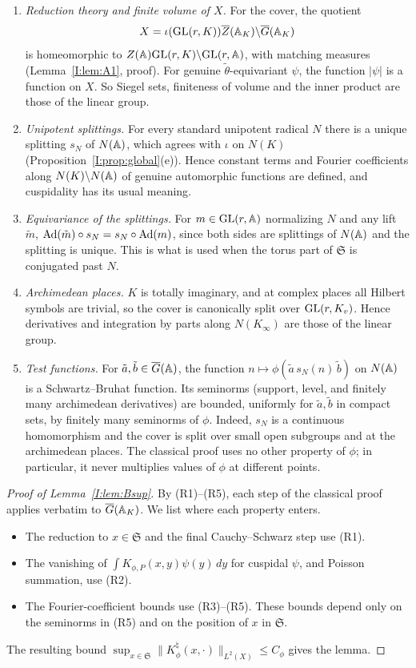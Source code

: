 \begin{enumerate}[label=(R\arabic*),leftmargin=3em]
\item \emph{Reduction theory and finite volume of $X$.} For the cover, the quotient \[ X=\iota(\mathrm{GL}(r,K))\overline{Z}(\mathbb{A}_K)\backslash\overline{G}(\mathbb{A}_K) \] is homeomorphic to $Z(\mathbb{A})\mathrm{GL}(r,K)\backslash\mathrm{GL}(r,\mathbb{A})$, with matching measures (Lemma~\ref{I:lem:A1}, proof). For genuine $\tilde\theta$-equivariant $\psi$, the function $|\psi|$ is a function on $X$. So Siegel sets, finiteness of volume and the inner product are those of the linear group.
\item \emph{Unipotent splittings.} For every standard unipotent radical $N$ there is a unique splitting $s_N$ of $N(\mathbb{A})$, which agrees with $\iota$ on $N(K)$ (Proposition~\ref{I:prop:global}(e)). Hence constant terms and Fourier coefficients along $N(K)\backslash N(\mathbb{A})$ of genuine automorphic functions are defined, and cuspidality has its usual meaning.
\item \emph{Equivariance of the splittings.} For $m\in\mathrm{GL}(r,\mathbb{A})$ normalizing $N$ and any lift $\tilde m$, $\operatorname{Ad}(\tilde m)\circ s_N=s_N\circ\operatorname{Ad}(m)$, since both sides are splittings of $N(\mathbb{A})$ and the splitting is unique. This is what is used when the torus part of $\mathfrak S$ is conjugated past $N$.
\item \emph{Archimedean places.} $K$ is totally imaginary, and at complex places all Hilbert symbols are trivial, so the cover is canonically split over $\mathrm{GL}(r,K_v)$. Hence derivatives and integration by parts along $N(K_\infty)$ are those of the linear group.
\item \emph{Test functions.} For $\tilde a,\tilde b\in\overline{G}(\mathbb{A})$, the function $n\mapsto\phi(\tilde a\,s_N(n)\,\tilde b)$ on $N(\mathbb{A})$ is a Schwartz--Bruhat function. Its seminorms (support, level, and finitely many archimedean derivatives) are bounded, uniformly for $\tilde a,\tilde b$ in compact sets, by finitely many seminorms of $\phi$. Indeed, $s_N$ is a continuous homomorphism and the cover is split over small open subgroups and at the archimedean places. The classical proof uses no other property of $\phi$; in particular, it never multiplies values of $\phi$ at different points.
\end{enumerate}

\begin{proof}[Proof of Lemma~\ref{I:lem:Bsup}]
By (R1)--(R5), each step of the classical proof applies verbatim to $\overline{G}(\mathbb{A}_K)$. We list where each property enters.
\begin{itemize}
\item The reduction to $x\in\mathfrak S$ and the final Cauchy--Schwarz step use (R1).
\item The vanishing of $\int K_{\phi,P}(x,y)\psi(y)\,dy$ for cuspidal $\psi$, and Poisson summation, use (R2).
\item The Fourier-coefficient bounds use (R3)--(R5). These bounds depend only on the seminorms in (R5) and on the position of $x$ in $\mathfrak S$.
\end{itemize}
The resulting bound $\sup_{x\in\mathfrak S}\|K_\phi^\natural(x,\cdot)\|_{L^2(X)}\le C_\phi$ gives the lemma.
\end{proof}

